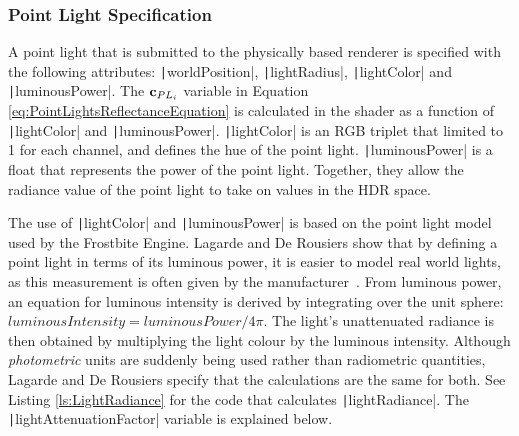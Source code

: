 \vspace{-0.1cm}


\vspace{-0.3cm}

\subsubsection{Point Light Specification}

A point light that is submitted to the physically based renderer is specified with the following attributes: \texttt|worldPosition|, \texttt|lightRadius|, \texttt|lightColor| and \texttt|luminousPower|. The \begin{math}\mathbf{c}_{PL_i}\end{math} variable in Equation \ref{eq:PointLightsReflectanceEquation} is calculated in the shader as a function of \texttt|lightColor| and \texttt|luminousPower|. \texttt|lightColor| is an RGB triplet that limited to 1 for each channel, and defines the hue of the point light. \texttt|luminousPower| is a float that represents the power of the point light. Together, they allow the radiance value of the point light to take on values in the HDR space.

The use of \texttt|lightColor| and \texttt|luminousPower| is based on the point light model used by the Frostbite Engine. Lagarde and De Rousiers show that by defining a point light in terms of its luminous power, it is easier to model real world lights, as this measurement is often given by the manufacturer~\cite{MovingFrostbitetoPBR}. From luminous power, an equation for luminous intensity is derived by integrating over the unit sphere: \begin{math}luminousIntensity = luminousPower / 4\pi\end{math}. The light's unattenuated radiance is then obtained by multiplying the light colour by the luminous intensity. Although \textit{photometric} units are suddenly being used rather than radiometric quantities, Lagarde and De Rousiers specify that the calculations are the same for both. See Listing \ref{ls:LightRadiance} for the code that calculates \texttt|lightRadiance|. The \texttt|lightAttenuationFactor| variable is explained below.

